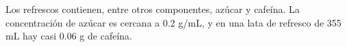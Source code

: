 \question[20] Los refrescos contienen, entre otros componentes, azúcar y cafeína.
La concentración de azúcar es cercana a 0.2 g/mL, y en una lata de refresco de 355 mL hay casi 0.06 g de cafeína.

\begin{parts}
    
    
\end{parts}
